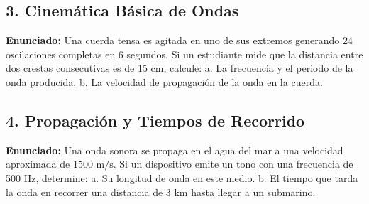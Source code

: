 \documentclass[12pt, letterpaper]{article}
\begin{document}

\subsection*{3. Cinemática Básica de Ondas}
\noindent \textbf{Enunciado:} Una cuerda tensa es agitada en uno de sus extremos generando 24 oscilaciones completas en 6 segundos. Si un estudiante mide que la distancia entre dos crestas consecutivas es de 15 cm, calcule: a. La frecuencia y el periodo de la onda producida. b. La velocidad de propagación de la onda en la cuerda.


\subsection*{4. Propagación y Tiempos de Recorrido}
\noindent \textbf{Enunciado:} Una onda sonora se propaga en el agua del mar a una velocidad aproximada de $1500 \text{ m/s}$. Si un dispositivo emite un tono con una frecuencia de 500 Hz, determine: a. Su longitud de onda en este medio. b. El tiempo que tarda la onda en recorrer una distancia de 3 km hasta llegar a un submarino.
\end{document}
